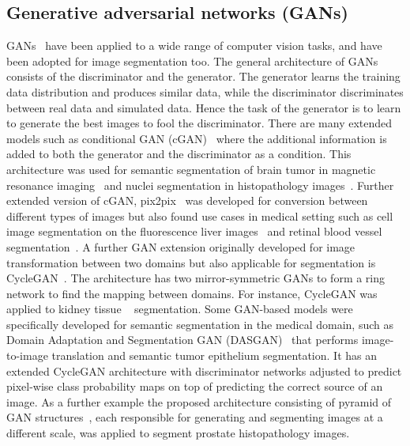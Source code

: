 \subsection{Generative adversarial networks (GANs)}
GANs~\cite{goodfellow2014generative} have been applied to a wide range of computer vision tasks, and have been adopted for image segmentation too. The general architecture of GANs consists of the discriminator and the generator. The generator learns the training data distribution and produces similar data, while the discriminator discriminates between real data and simulated data. Hence the task of the generator is to learn to generate the best images to fool the discriminator. There are many extended models such as conditional GAN (cGAN)~\cite{mirza2014conditional} where the additional information is added to both the generator and the discriminator as a condition. This architecture was used for semantic segmentation of brain tumor in magnetic resonance imaging~\cite{rezaei2017conditional} and nuclei segmentation in histopathology images~\cite{mahmood2019deep}. Further extended version of cGAN, pix2pix~\cite{isola2017image} was developed for conversion between different types of images but also found use cases in medical setting such as cell image segmentation on the fluorescence liver images~\cite{Tsuda_2019_CVPR_Workshops} and retinal blood vessel segmentation~\cite{popescu2021retinal}. A further GAN extension originally developed for image transformation between two domains but also applicable for segmentation is CycleGAN~\cite{zhu2017unpaired}. The architecture has two mirror-symmetric GANs to form a ring network to find the mapping between domains. For instance, CycleGAN was applied to kidney tissue ~\cite{gadermayr2019generative} segmentation. Some GAN-based models were specifically developed for semantic segmentation in the medical domain, such as Domain Adaptation and Segmentation GAN (DASGAN)~\cite{kapil2019dasgan} that performs image-to-image translation and semantic tumor epithelium segmentation. It has an extended CycleGAN architecture with discriminator networks adjusted to predict pixel-wise class probability maps on top of predicting the correct source of an image. As a further example the proposed architecture consisting of pyramid of GAN structures~\cite{li2022high}, each responsible for generating and segmenting images at a different scale, was applied to segment prostate histopathology images.

